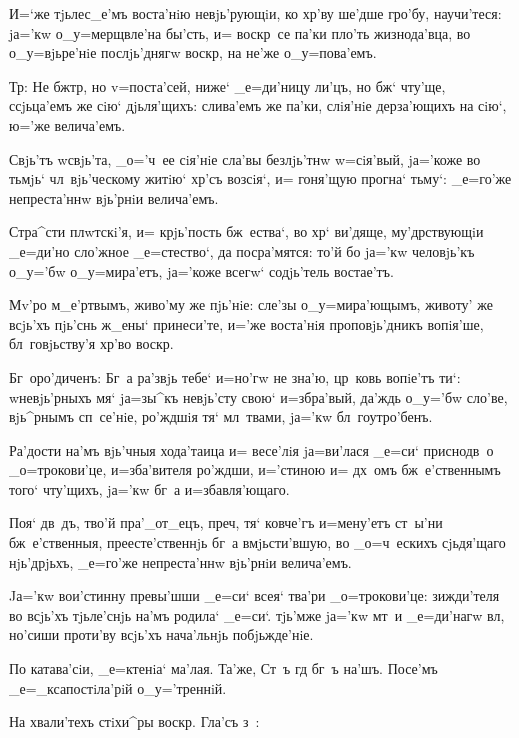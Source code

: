 И=`же тjьлес_е'мъ воста'нiю невjь'рующiи, ко хр'ву 
ше'дше гро'бу, научи'теся: jа='кw о_у=мерщвле'на бы'сть, 
и= воскр~се па'ки пло'ть жизнода'вца, во о_у=вjьре'нiе 
послjь'днягw воскр, на не'же о_у=пова'емъ.

Тр: Не бж тр, но v=поста'сей, ниже` 
_е=ди'ницу ли'цъ, но бж` чту'ще, ссjьца'емъ же сiю` 
дjьля'щихъ: слива'емъ же па'ки, слiя'нiе дерза'ющихъ на 
сiю`, ю='же велича'емъ.


Свjь'тъ w\т свjь'та, _о='ч~ее сiя'нiе сла'вы 
безлjь'тнw w=сiя'вый, jа='коже во тьмjь` чл~вjь'ческому 
житiю` хр'съ возсiя`, и= гоня'щую прогна` тьму`: 
_е=го'же непреста'ннw вjь'рнiи велича'емъ.

Стра^сти плwтскi'я, и= крjь'пость бж~ества`, во 
хр` ви'дяще, му'дрствующiи _е=ди'но сло'жное 
_е=стество`, да посра'мятся: то'й бо jа='кw человjь'къ 
о_у='бw о_у=мира'етъ, jа='коже всегw` содjь'тель 
востае'тъ.

Мv'ро м_е'ртвымъ, живо'му же пjь'нiе: сле'зы 
о_у=мира'ющымъ, животу' же всjь'хъ пjь'снь ж_ены` 
принеси'те, и='же воста'нiя проповjь'дникъ вопiя'ше, 
бл~говjьству'я хр'во воскр.

Бг~оро'диченъ: Бг~а ра'звjь тебе` и=но'гw не зна'ю, 
цр~ковь вопiе'тъ ти`: w\т невjь'рныхъ мя` jа=зы^къ 
невjь'сту свою` и=збра'вый, да'ждь о_у='бw сло'ве, 
вjь^рнымъ сп~се'нiе, ро'ждшiя тя` мл~твами, jа='кw 
бл~гоутро'бенъ.


Ра'дости на'мъ вjь'чныя хода'таица и= весе'лiя 
jа=ви'лася _е=си` приснодв~о _о=трокови'це, и=зба'вителя 
ро'ждши, и='стиною и= дх~омъ бж~е'ственнымъ того` 
чту'щихъ, jа='кw бг~а и=збавля'ющаго.

Поя` дв~дъ, тво'й пра'_от_ецъ, преч, тя` ковче'гъ 
и=мену'етъ ст~ы'ни бж~е'ственныя, преесте'ственнjь бг~а 
вмjьсти'вшую, во _о=ч~ескихъ сjьдя'щаго нjь'дрjьхъ, 
_е=го'же непреста'ннw вjь'рнiи велича'емъ.

Jа='кw вои'стинну превы'шши _е=си` всея` тва'ри 
_о=трокови'це: зижди'теля во всjь'хъ тjьле'снjь на'мъ 
родила` _е=си`. тjь'мже jа='кw мт~и _е=ди'нагw вл, 
но'сиши проти'ву всjь'хъ нача'льнjь побjьжде'нiе.

По катава'сiи, _е=ктенiа` ма'лая. Та'же, Ст~ъ гд 
бг~ъ на'шъ. Посе'мъ _е=_ксапостiла'рiй о_у='треннiй.

На хвали'техъ стiхи^ры воскр. Гла'съ з~:

